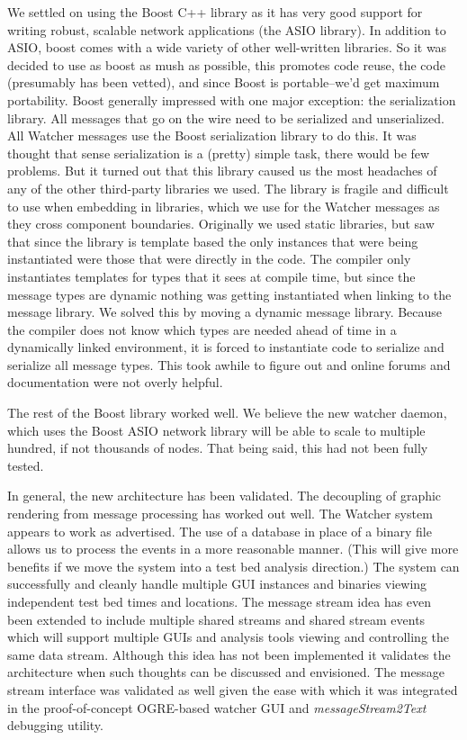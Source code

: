 \documentclass{report}
\begin{document}
We settled on using the Boost C++ library as it has very good support for writing robust, scalable network applications (the ASIO library). In addition
to ASIO, boost comes with a wide variety of other well-written libraries. So it was decided to use as boost as mush as possible, this promotes code reuse, 
the code (presumably has been vetted), and since Boost is portable--we'd get maximum portability. Boost generally impressed with one major exception: the 
serialization library. All messages that go on the wire need to be serialized and unserialized. All Watcher messages use the Boost serialization library to do
this. It was thought that sense serialization is a (pretty) simple task, there would be few problems. But it turned out that this library caused us the most headaches 
of any of the other third-party libraries we used. The library is fragile and difficult to use when embedding in libraries, which we use for the Watcher messages as they 
cross component boundaries. Originally we used static libraries, but saw that since the library is template based the only instances that were being instantiated 
were those that were directly in the code. The compiler only instantiates templates for types that it sees at compile time, but since the message types are dynamic
nothing was getting instantiated when linking to the message library. We solved this by moving a dynamic message library. Because the compiler does not know which types
are needed ahead of time in a dynamically linked environment, it is forced to instantiate code to serialize and serialize all message types. This took awhile to 
figure out and online forums and documentation were not overly helpful. 

The rest of the Boost library worked well. We believe the new watcher daemon, which uses the Boost ASIO network library will be able to scale
to multiple hundred, if not thousands of nodes. That being said, this had not been fully tested. 

In general, the new architecture has been validated. The decoupling of graphic rendering from message processing has worked out well. The Watcher system
appears to work as advertised. The use of a database in place of a binary file allows us to process the events in a more reasonable manner. (This will give
more benefits if we move the system into a test bed analysis direction.) The system can successfully and cleanly handle multiple GUI instances and binaries 
viewing independent test bed times and locations. The message stream idea has even been extended to include multiple shared streams and shared stream events
which will support multiple GUIs and analysis tools viewing and controlling the same data stream. Although this idea has not been implemented it validates
the architecture when such thoughts can be discussed and envisioned. The message stream interface was validated as well given the ease with which it 
was integrated in the proof-of-concept OGRE-based watcher GUI and {\it messageStream2Text} debugging utility. 
\end{document}
